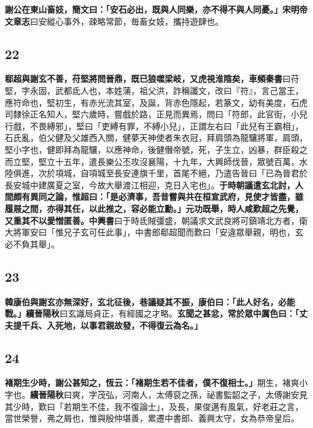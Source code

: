 \textbf{謝公在東山畜妓，簡文曰：「安石必出，既與人同樂，亦不得不與人同憂。」}{\footnotesize \textbf{宋明帝文章志}曰安縱心事外，疎略常節，毎畜女妓，攜持遊肆也。}

\subsection*{22}

\textbf{郗超與謝玄不善，苻堅將問晉鼎，既已狼噬梁岐，又虎視淮陰矣，}{\footnotesize \textbf{車頻秦書}曰苻堅，字永固，武都氐人也，本姓蒲，祖父洪，詐稱讖文，改曰『符』，言己當王，應符命也，堅初生，有赤光流其室，及誕，背赤色隱起，若篆文，幼有美度，石虎司隸徐正名知人，堅六歲時，嘗戲於路，正見而異焉，問曰「符郎，此官街，小兒行戲，不畏縛邪」，堅曰「吏縛有罪，不縛小兒」，正謂左右曰「此兒有王霸相」，石氏亂，伯父健及父雄西入關，健夢天神使者朱衣冠，拜肩頭為龍驤將軍，肩頭，堅小字也，健即拜為龍驤，以應神命，後健僭帝號，死，子生立，凶暴，群臣殺之而立堅，堅立十五年，遣長樂公丕攻沒襄陽，十九年，大興師伐晉，眾號百萬，水陸俱進，次於項城，自項城至長安連旗千里，首尾不絕，乃遣告晉曰「已為晉君於長安城中建廣夏之室，今故大舉渡江相迎，克日入宅也」。}\textbf{于時朝議遣玄北討，人間頗有異同之論，惟超曰：「是必濟事，吾昔嘗與共在桓宣武府，見使才皆盡，雖履屐之間，亦得其任，以此推之，容必能立勳。」元功既舉，時人咸歎超之先覺，又重其不以愛憎匿善。}{\footnotesize \textbf{中興書}曰于時氐賊彊盛，朝議求文武良將可鎮靖北方者，衛大將軍安曰「惟兄子玄可任此事」，中書郎郗超聞而歎曰「安違眾舉親，明也，玄必不負其舉」。}

\subsection*{23}

\textbf{韓康伯與謝玄亦無深好，玄北征後，巷議疑其不振，康伯曰：「此人好名，必能戰。」}{\footnotesize \textbf{續晉陽秋}曰玄識局貞正，有經國之才略。}\textbf{玄聞之甚忿，常於眾中厲色曰：「丈夫提千兵、入死地，以事君親故發，不得復云為名。」}

\subsection*{24}

\textbf{褚期生少時，謝公甚知之，恆云：「褚期生若不佳者，僕不復相士。」}{\footnotesize 期生，褚爽小字也。\textbf{續晉陽秋}曰爽，字茂弘，河南人，太傅裒之孫，祕書監韶之子，太傅謝安見其少時，歎曰「若期生不佳，我不復論士」，及長，果俊邁有風氣，好老莊之言，當世榮譽，弗之屑也，惟與殷仲堪善，累遷中書郎、義興太守，女為恭帝皇后。}

